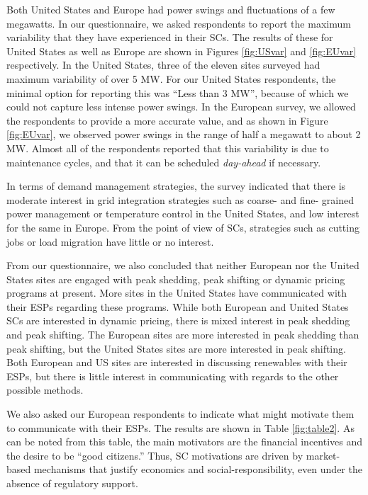 Both United States and Europe had power swings and fluctuations of a few megawatts. In our questionnaire, we asked respondents to report the maximum variability that they have experienced in their SCs. The results of these for United States as well as Europe are shown in Figures \ref{fig:USvar} and \ref{fig:EUvar} respectively. In the United States, three of the eleven sites surveyed had maximum variability of over 5 MW. For our United States respondents, the minimal option for reporting this was ``Less than 3 MW'', because of which we could not capture less intense power swings. In the European survey, we allowed the respondents to provide a more accurate value, and as shown in Figure \ref{fig:EUvar}, we observed power swings in the range of half a megawatt to about 2 MW. Almost all of the respondents reported that this variability is due to maintenance cycles, and that it can be scheduled \emph{day-ahead} if necessary.

In terms of demand management strategies, the survey indicated that there is moderate interest in grid integration strategies such as coarse- and fine- grained power management or temperature control in the United States, and low interest for the same in Europe. From the point of view of SCs, strategies such as cutting jobs or load migration have little or no interest. 

From our questionnaire, we also concluded that neither European nor the United States sites are engaged with peak shedding, peak shifting or dynamic pricing programs at present. More sites in the United States have communicated with their ESPs regarding these programs. While both European and United States SCs are interested in dynamic pricing, there is mixed interest in peak shedding and peak shifting. The European sites are more interested in peak shedding than peak shifting, but the United States sites are more interested in peak shifting. Both European and US sites are interested in discussing renewables with their ESPs, but there is little interest in communicating with regards to the other possible methods.



We also asked our European respondents to indicate what might motivate them to communicate with their ESPs. The results are shown in Table \ref{fig:table2}. As can be noted from this table, the main motivators are the financial incentives and the desire to be ``good citizens.'' Thus, SC motivations are driven by market-based mechanisms that justify economics and social-responsibility, even under the absence of regulatory support.

